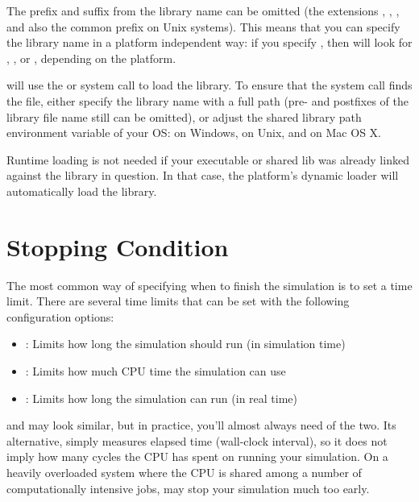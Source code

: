 The prefix and suffix from the library name can be omitted (the extensions
, , , and also the common  prefix
on Unix systems). This means that you can specify the library name in a
platform independent way: if you specify , then {\opp} will
look for , ,  or ,
depending on the platform.

{\opp} will use the  or  system call to
load the library. To ensure that the system call finds the file, either
specify the library name with a full path (pre- and postfixes of the library 
file name still can be omitted), or adjust the shared library path environment
variable of your OS:  on Windows,  on Unix,
and  on Mac OS X.

\begin{note}
  Runtime loading is not needed if your executable or shared lib was
  already linked against the library in question. In that case,
  the platform's dynamic loader will automatically load the library.
\end{note}


\section{Stopping Condition}
\label{sec:run-sim:stopping-condition}

The most common way of specifying when to finish the simulation is to set a
time limit. There are several time limits that can be set with the following
configuration options:

\begin{itemize}
  \item {} : Limits how long the simulation should run (in simulation time)
  \item {} : Limits how much CPU time the simulation can use
  \item {} : Limits how long the simulation can run (in real time)
\end{itemize}

\begin{note}
 and  may look
similar, but in practice, you'll almost always need  of
the two. Its alternative,  simply measures elapsed
time (wall-clock interval), so it does not imply how many cycles the CPU has
spent on running your simulation. On a heavily overloaded system where the CPU
is shared among a number of computationally intensive jobs,
 may stop your simulation much too early.
\end{note}

